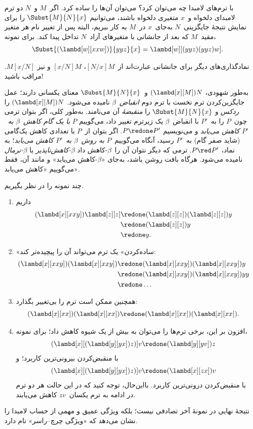 \documentclass[../../../include/open-logic-section]{subfiles}
\begin{document}

با ترم‌های لامبدا چه می‌توان کرد؟ می‌توان آن‌ها را ساده کرد. اگر~$M$
و~$N$ دو ترم لامبدای دلخواه و~$x$ متغیری دلخواه باشند، می‌توانیم
$\Subst{M}{N}{x}$ را برای نمایش نتیجهٔ جایگزینی~$N$ به‌جای~$x$ در~$M$
به کار ببریم، البته پس از تغییر نام هر متغیر مقید~$M$ که بعد از جانشانی
با متغیرهای آزاد~$N$ تداخل پیدا کند. برای نمونه،
\[
\Subst{(\lambd[w][xxw])}{yyz}{x} = \lambd[w][(yyz)(yyz)w].
\]

\begin{digress}
نمادگذاری‌های دیگر برای جانشانی عبارت‌اند از~$[N/x]M$، $[x/N]M$ و نیز
$M[x/N]$. مراقب باشید!
\end{digress}

به‌طور شهودی، $(\lambd[x][M])N$ و~$\Subst{M}{N}{x}$ معنای یکسانی
دارند؛ عمل جایگزین‌کردن ترم نخست با ترم دوم \emph{انقباض~$\beta$}
نامیده می‌شود. $(\lambd[x][M])N$ را \emph{ردکس} و
$\Subst{M}{N}{x}$ را \emph{منقبضۀ} آن می‌نامند. به‌طور کلی، اگر بتوان
ترمی چون~$P$ را به~$P'$ با انقباض~$\beta$ یک زیرترم تغییر داد، می‌گوییم
$P$ \emph{با یک گام کاهش~$\beta$ به~$P'$ کاهش می‌یابد} و می‌نویسیم
$P \redone P'$. اگر بتوان از~$P$ با تعدادی کاهش یک‌گامی (شاید صفر گام)
به~$P'$ رسید، آنگاه می‌گوییم~$P$ \emph{به روش~$\beta$ به~$P'$ کاهش
می‌یابد}؛ به نماد،
$P \red P'$. ترمی که دیگر نتوان آن را~$\beta$-کاهش داد
\emph{$\beta$-کاهش‌ناپذیر} یا \emph{$\beta$-نرمال} نامیده می‌شود. هرگاه
بافت روشن باشد، به‌جای «$\beta$-کاهش می‌یابد» و مانند آن، فقط می‌گوییم
«کاهش می‌یابد».

چند نمونه را در نظر بگیریم.
\begin{enumerate}
\item داریم
\begin{align*}
(\lambd[x][xxy]) \lambd[z][z] & \redone (\lambd[z][z])(\lambd[z][z]) y \\
& \redone (\lambd[z][z]) y \\
& \redone y.
\end{align*}
\item «ساده‌کردن» یک ترم می‌تواند آن را پیچیده‌تر کند:
\begin{align*}
(\lambd[x][xxy])(\lambd[x][xxy]) & \redone (\lambd[x][xxy])(\lambd[x][xxy])y \\
& \redone (\lambd[x][xxy])(\lambd[x][xxy])yy \\
& \redone \dots
\end{align*}
\item همچنین ممکن است ترم را بی‌تغییر بگذارد:
\[
(\lambd[x][xx])(\lambd[x][xx]) \redone (\lambd[x][xx])(\lambd[x][xx]).
\]
\item افزون بر این، برخی ترم‌ها را می‌توان به بیش از یک شیوه کاهش داد؛
  برای نمونه،
\[
(\lambd[x][(\lambd[y][yx]) z)] v \redone (\lambd[y][yv]) z
\]
با منقبض‌کردن بیرونی‌ترین کاربرد؛ و
\[
(\lambd[x][(\lambd[y][yx]) z)] v \redone (\lambd[x][zx]) v
\]
با منقبض‌کردن درونی‌ترین کاربرد. بااین‌حال، توجه کنید که در این حالت هر
دو ترم در ادامه به ترم یکسان~$zv$ کاهش می‌یابند.
\end{enumerate}

نتیجهٔ نهایی در نمونهٔ آخر تصادفی نیست؛ بلکه ویژگی عمیق و مهمی از حساب
لامبدا را نشان می‌دهد که «ویژگی چرچ--راسر» نام دارد.
\end{document}
